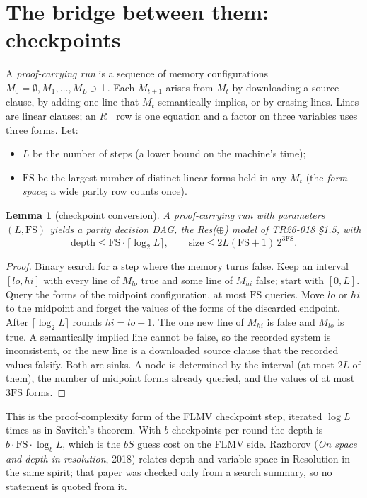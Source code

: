 \documentclass[11pt]{article}
\newtheorem{lemma}[theorem]{Lemma}
\begin{document}
\section{The bridge between them: checkpoints}
A \emph{proof-carrying run} is a sequence of memory configurations $M_0=\emptyset,M_1,\dots,M_L\ni\bot$. Each $M_{t+1}$ arises from $M_t$ by downloading a source clause, by adding one line that $M_t$ semantically implies, or by erasing lines. Lines are linear clauses; an $R^-$ row is one equation and a factor on three variables uses three forms. Let:
\begin{itemize}
\item $L$ be the number of steps (a lower bound on the machine's time);
\item $\mathrm{FS}$ be the largest number of distinct linear forms held in any $M_t$ (the \emph{form space}; a wide parity row counts once).
\end{itemize}

\begin{lemma}[checkpoint conversion]\label{lem:cp}
A proof-carrying run with parameters $(L,\mathrm{FS})$ yields a parity decision DAG, the Res($\oplus$) model of TR26-018 \S1.5, with
\[\text{depth}\le \mathrm{FS}\cdot\lceil\log_2L\rceil,\qquad\text{size}\le 2L(\mathrm{FS}+1)\,2^{3\mathrm{FS}}.\]
\end{lemma}
\begin{proof}
Binary search for a step where the memory turns false. Keep an interval $[lo,hi]$ with every line of $M_{lo}$ true and some line of $M_{hi}$ false; start with $[0,L]$. Query the forms of the midpoint configuration, at most $\mathrm{FS}$ queries. Move $lo$ or $hi$ to the midpoint and forget the values of the forms of the discarded endpoint. After $\lceil\log_2L\rceil$ rounds $hi=lo+1$. The one new line of $M_{hi}$ is false and $M_{lo}$ is true. A semantically implied line cannot be false, so the recorded system is inconsistent, or the new line is a downloaded source clause that the recorded values falsify. Both are sinks. A node is determined by the interval (at most $2L$ of them), the number of midpoint forms already queried, and the values of at most $3\mathrm{FS}$ forms.
\end{proof}

This is the proof-complexity form of the FLMV checkpoint step, iterated $\log L$ times as in Savitch's theorem. With $b$ checkpoints per round the depth is $b\cdot\mathrm{FS}\cdot\log_bL$, which is the $bS$ guess cost on the FLMV side. Razborov (\emph{On space and depth in resolution}, 2018) relates depth and variable space in Resolution in the same spirit; that paper was checked only from a search summary, so no statement is quoted from it.
\end{document}
